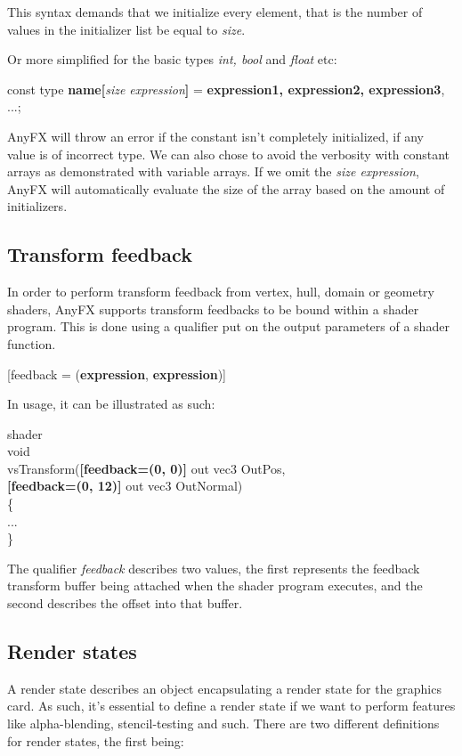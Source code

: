 \documentclass{article}
\newcommand{\SyntaxBox}[1]
{	
	\begin{center}
	\colorbox{orange!60}
	{
		\begin{minipage}{\linewidth}
		\hfill
		\begin{tabbing}
		#1
		\end{tabbing}
		\end{minipage}
	}
	\end{center}
}
\begin{document}
This syntax demands that we initialize every element, that is the number of values in the initializer list be equal to \textit{size}.

Or more simplified for the basic types \textit{int, bool} and \textit{float} etc:

\SyntaxBox
{
	const type \textbf{name[}\textit{size expression}\textbf{]} = \textbf{ expression1, expression2, expression3}, ...;
}


AnyFX will throw an error if the constant isn't completely initialized, if any value is of incorrect type. We can also chose to avoid the verbosity with constant arrays as demonstrated with variable arrays. If we omit the \textit{size expression}, AnyFX will automatically evaluate the size of the array based on the amount of initializers. 

\subsection{Transform feedback}
In order to perform transform feedback from vertex, hull, domain or geometry shaders, AnyFX supports transform feedbacks to be bound within a shader program. This is done using a qualifier put on the output parameters of a shader function.

\SyntaxBox
{
	[feedback = (\textbf{expression}, \textbf{expression})] \\
}

In usage, it can be illustrated as such:

\SyntaxBox
{
	shader \\
	void \\
	vsTransform(\=\textbf{[feedback=(0, 0)]} out vec3 OutPos, \\
		\> \textbf{[feedback=(0, 12)]} out vec3 OutNormal) \\
	\{ \= \\
	\>... \\
	\}
}

The qualifier \textit{feedback} describes two values, the first represents the feedback transform buffer being attached when the shader program executes, and the second describes the offset into that buffer.

\subsection{Render states}
A render state describes an object encapsulating a render state for the graphics card. As such, it's essential to define a render state if we want to perform features like alpha-blending, stencil-testing and such. There are two different definitions for render states, the first being:
\end{document}
